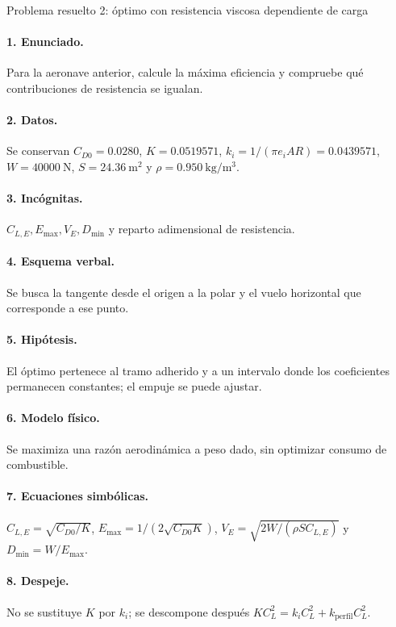 \begin{studiumworked}{Problema resuelto 2: óptimo con resistencia viscosa dependiente de carga}

\paragraph{1. Enunciado.} Para la aeronave anterior, calcule la máxima eficiencia y compruebe qué contribuciones de resistencia se igualan.
\paragraph{2. Datos.} Se conservan $C_{D0}=0.0280$, $K=0.0519571$, $k_i=1/(\pi e_i AR)=0.0439571$, $W=40000\ \mathrm N$, $S=24.36\ \mathrm{m^2}$ y $\rho=0.950\ \mathrm{kg/m^3}$.
\paragraph{3. Incógnitas.} $C_{L,E},E_{\max},V_E,D_{\min}$ y reparto adimensional de resistencia.
\paragraph{4. Esquema verbal.} Se busca la tangente desde el origen a la polar y el vuelo horizontal que corresponde a ese punto.
\paragraph{5. Hipótesis.} El óptimo pertenece al tramo adherido y a un intervalo donde los coeficientes permanecen constantes; el empuje se puede ajustar.
\paragraph{6. Modelo físico.} Se maximiza una razón aerodinámica a peso dado, sin optimizar consumo de combustible.
\paragraph{7. Ecuaciones simbólicas.} $C_{L,E}=\sqrt{C_{D0}/K}$, $E_{\max}=1/(2\sqrt{C_{D0}K})$, $V_E=\sqrt{2W/(\rho SC_{L,E})}$ y $D_{\min}=W/E_{\max}$.
\paragraph{8. Despeje.} No se sustituye $K$ por $k_i$; se descompone después $KC_L^2=k_iC_L^2+k_{\mathrm{perfil}}C_L^2$.

\end{studiumworked}

